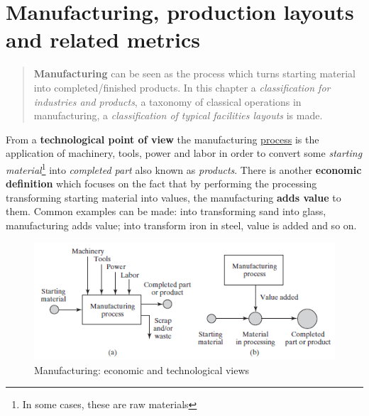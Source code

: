 \chapter[Manufacturing, layouts and metrics]{Manufacturing, production layouts and related metrics}
\vspace{-0.5cm}
\minitoc

\begin{quotation}
    \textsf{\noindent\textbf{Manufacturing} can be seen as the process which turns starting material into completed/finished products. In this chapter a \textit{classification for industries and products}, a taxonomy of classical operations in manufacturing, a \textit{classification of typical facilities layouts} is made.}
\end{quotation}
From a \textbf{technological point of view} the manufacturing \underline{process} is the application of machinery, tools, power and labor in order to convert some \textit{starting material}\footnote{
    In some cases, these are raw materials
} into \textit{completed part} also known as \textit{products}. There is another \textbf{economic definition} which focuses on the fact that by performing the processing transforming starting material into values, the manufacturing \textbf{adds value} to them. Common examples can be made: into transforming sand into glass, manufacturing adds value; into transform iron in steel, value is added and so on.

\begin{figure}[h]
    \centering
    \includegraphics[scale=1]{img/manifacturing.png}
    \caption{Manufacturing: economic and technological views}
    \label{fig:manifacturing_views}
\end{figure}
  

